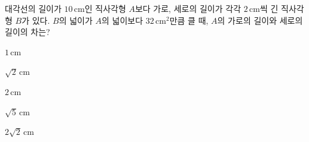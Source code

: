 대각선의 길이가 $10\,\mathrm{cm}$인 직사각형 $A$보다 가로, 세로의 길이가 각각 $2\,\mathrm{cm}$씩 긴 직사각형 $B$가 있다. $B$의 넓이가 $A$의 넓이보다 $32\,\mathrm{cm^2}$만큼 클 때, $A$의 가로의 길이와 세로의 길이의 차는?
\begin{choices32}{\rule[-3ex]{0pt}{8ex}$1\,\mathrm{cm}$}{\rule[-3ex]{0pt}{8ex}$\sqrt{2}\,\mathrm{cm}$}{\rule[-3ex]{0pt}{8ex}$2\,\mathrm{cm}$}{\rule[-3ex]{0pt}{8ex}$\sqrt{5}\,\mathrm{cm}$}{\rule[-3ex]{0pt}{8ex}$2\sqrt{2}\,\mathrm{cm}$}\end{choices32}
